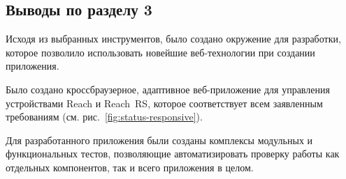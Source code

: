 {\color{gray}{*listing*}}



\subsection{Выводы по разделу 3}

\begin{dashitemize}
  \item Исходя из выбранных инструментов, было создано окружение для разработки, которое позволило использовать новейшие веб-технологии при создании приложения.
  \item Было создано кроссбраузерное, адаптивное веб-приложение для управления устройствами Reach и Reach~RS, которое соответствует всем заявленным требованиям (см. рис.~\ref{fig:status-responsive}).
  \item Для разработанного приложения были созданы комплексы модульных и функциональных тестов, позволяющие автоматизировать проверку работы как отдельных компонентов, так и всего приложения в целом.
\end{dashitemize}

